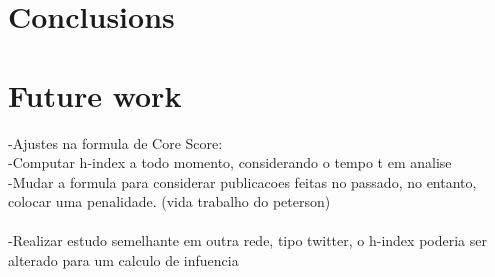 
\section{Conclusions}

\section{Future work}
-Ajustes na formula de Core Score:\\
-Computar h-index a todo momento, considerando o tempo t em analise\\
-Mudar a formula para considerar publicacoes feitas no passado, no entanto, colocar uma penalidade. (vida trabalho do peterson)\\
\\
-Realizar estudo semelhante em outra rede, tipo twitter, o h-index poderia ser alterado para um calculo de infuencia
%
%

